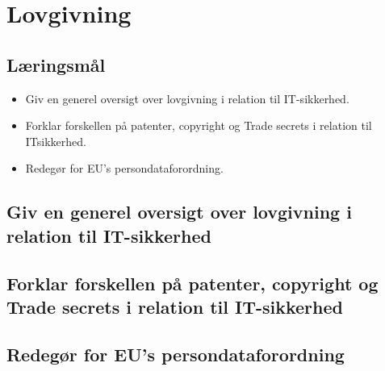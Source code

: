 \section{Lovgivning}

\subsection{Læringsmål}

\begin{itemize}
	\item Giv en generel oversigt over lovgivning i relation til IT-sikkerhed.
	\item Forklar forskellen på patenter, copyright og Trade secrets i relation til ITsikkerhed.
	\item Redegør for EU's persondataforordning.
\end{itemize}

\subsection{Giv en generel oversigt over lovgivning i relation til IT-sikkerhed}
\subsection{Forklar forskellen på patenter, copyright og Trade secrets i relation til IT-sikkerhed}
\subsection{Redegør for EU's persondataforordning}
